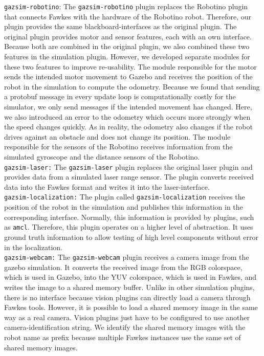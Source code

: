 \texttt{gazsim-robotino}:
The \texttt{gazsim-robotino} plugin replaces the Robotino plugin that connects Fawkes with the hardware of the Robotino robot. Therefore, our plugin provides the same blackboard-interfaces as the original plugin. The original plugin provides motor and sensor features, each with an own interface. Because both are combined in the original plugin, we also combined these two features in the simulation plugin. However, we developed separate modules for these two features to improve re-usability. The module responsible for the motor sends the intended motor movement to Gazebo and receives the position of the robot in the simulation to compute the odometry. Because we found that sending a protobuf message in every update loop is computationally costly for the simulator, we only send messages if the intended movement has changed. Here, we also introduced an error to the odometry which occurs more strongly when the speed changes quickly. As in reality, the odometry also changes if the robot drives against an obstacle and does not change its position. The module responsible for the sensors of the Robotino receives information from the simulated gyroscope and the distance sensors of the Robotino.\\

\texttt{gazsim-laser:}
The \texttt{gazsim-laser} plugin replaces the original laser plugin and provides data from a simulated laser range sensor. The plugin converts received data into the Fawkes format and writes it into the laser-interface.\\

\texttt{gazsim-localization:}
The plugin called \texttt{gazsim-localization} receives the position of the robot in the simulation and publishes this information in the corresponding interface. Normally, this information is provided by plugins, such as \texttt{amcl}. Therefore, this plugin operates on a higher level of abstraction. It uses ground truth information to allow testing of high level components without error in the localization. \\

\texttt{gazsim-webcam:}
The \texttt{gazsim-webcam} plugin receives a camera image from the gazebo simulation. It converts the received image from the RGB colorspace, which is used in Gazebo, into the YUV colorspace, which is used in Fawkes, and writes the image to a shared memory buffer. Unlike in other simulation plugins, there is no interface because vision plugins can directly load a camera through Fawkes tools. However, it is possible to load a shared memory image in the same way as a real camera. Vision plugins just have to be configured to use another camera-identification string. We identify the shared memory images with the robot name as prefix because multiple Fawkes instances use the same set of shared memory images. %
\\

